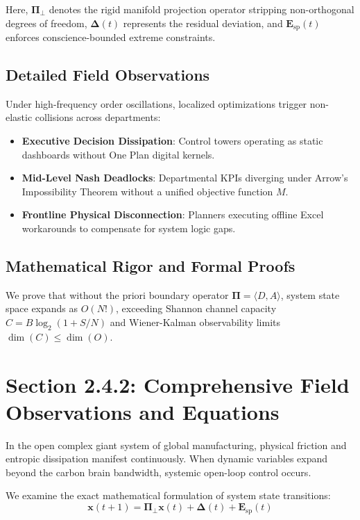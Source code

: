 \documentclass[12pt,a4paper,oneside]{book}
\begin{document}
Here, $\mathbf{\Pi}_{\bot}$ denotes the rigid manifold projection operator stripping non-orthogonal degrees of freedom, $\mathbf{\Delta}(t)$ represents the residual deviation, and $\mathbf{E}_{\mathrm{sp}}(t)$ enforces conscience-bounded extreme constraints.

\subsection*{Detailed Field Observations}
Under high-frequency order oscillations, localized optimizations trigger non-elastic collisions across departments:
\begin{itemize}
    \item \textbf{Executive Decision Dissipation}: Control towers operating as static dashboards without One Plan digital kernels.
    \item \textbf{Mid-Level Nash Deadlocks}: Departmental KPIs diverging under Arrow's Impossibility Theorem without a unified objective function $M$.
    \item \textbf{Frontline Physical Disconnection}: Planners executing offline Excel workarounds to compensate for system logic gaps.
\end{itemize}

\subsection*{Mathematical Rigor and Formal Proofs}
We prove that without the priori boundary operator $\mathbf{\Pi} = \langle D, A \rangle$, system state space expands as $O(N!)$, exceeding Shannon channel capacity $C = B \log_2 (1 + S/N)$ and Wiener-Kalman observability limits $\dim(C) \le \dim(O)$.
\clearpage
\section{Section 2.4.2: Comprehensive Field Observations and Equations}

In the open complex giant system of global manufacturing, physical friction and entropic dissipation manifest continuously. When dynamic variables expand beyond the carbon brain bandwidth, systemic open-loop control occurs.

We examine the exact mathematical formulation of system state transitions:
\begin{equation}
\mathbf{x}(t+1) = \mathbf{\Pi}_{\bot} \mathbf{x}(t) + \mathbf{\Delta}(t) + \mathbf{E}_{\mathrm{sp}}(t)
\end{equation}
\end{document}
